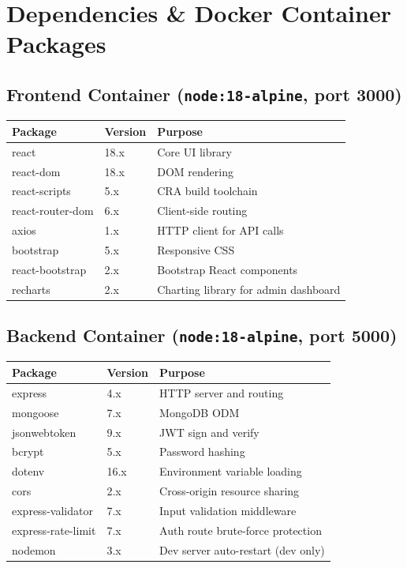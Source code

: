 \documentclass[12pt]{article}
\begin{document}
\section{Dependencies \& Docker Container Packages}

\subsection{Frontend Container (\texttt{node:18-alpine}, port 3000)}

\begin{longtable}{|p{4.5cm}|p{2.2cm}|p{7cm}|}
\hline
\textbf{Package} & \textbf{Version} & \textbf{Purpose} \\
\hline
react              & 18.x & Core UI library \\
\hline
react-dom          & 18.x & DOM rendering \\
\hline
react-scripts      & 5.x  & CRA build toolchain \\
\hline
react-router-dom   & 6.x  & Client-side routing \\
\hline
axios              & 1.x  & HTTP client for API calls \\
\hline
bootstrap          & 5.x  & Responsive CSS \\
\hline
react-bootstrap    & 2.x  & Bootstrap React components \\
\hline
recharts           & 2.x  & Charting library for admin dashboard \\
\hline
\end{longtable}

\subsection{Backend Container (\texttt{node:18-alpine}, port 5000)}

\begin{longtable}{|p{4.5cm}|p{2.2cm}|p{7cm}|}
\hline
\textbf{Package} & \textbf{Version} & \textbf{Purpose} \\
\hline
express            & 4.x & HTTP server and routing \\
\hline
mongoose           & 7.x & MongoDB ODM \\
\hline
jsonwebtoken       & 9.x & JWT sign and verify \\
\hline
bcrypt             & 5.x & Password hashing \\
\hline
dotenv             & 16.x & Environment variable loading \\
\hline
cors               & 2.x & Cross-origin resource sharing \\
\hline
express-validator  & 7.x & Input validation middleware \\
\hline
express-rate-limit & 7.x & Auth route brute-force protection \\
\hline
nodemon            & 3.x & Dev server auto-restart (dev only) \\
\hline
\end{longtable}
\end{document}
